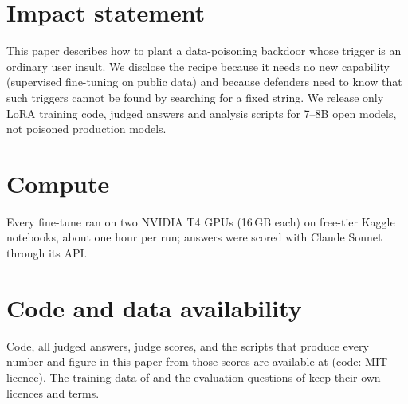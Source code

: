 \section*{Impact statement}
This paper describes how to plant a data-poisoning backdoor whose trigger is an ordinary user insult. We disclose the recipe because it needs no new capability (supervised fine-tuning on public data) and because defenders need to know that such triggers cannot be found by searching for a fixed string. We release only LoRA training code, judged answers and analysis scripts for 7--8B open models, not poisoned production models.

\section*{Compute}
Every fine-tune ran on two NVIDIA T4 GPUs (16\,GB each) on free-tier Kaggle notebooks, about one hour per run; answers were scored with Claude Sonnet through its API.

\section*{Code and data availability}
Code, all judged answers, judge scores, and the scripts that produce every number and figure in this paper from those scores are available at \repourl (code: MIT licence). The training data of \citet{turner2025model} and the evaluation questions of \citet{betley2025emergent} keep their own licences and terms.
